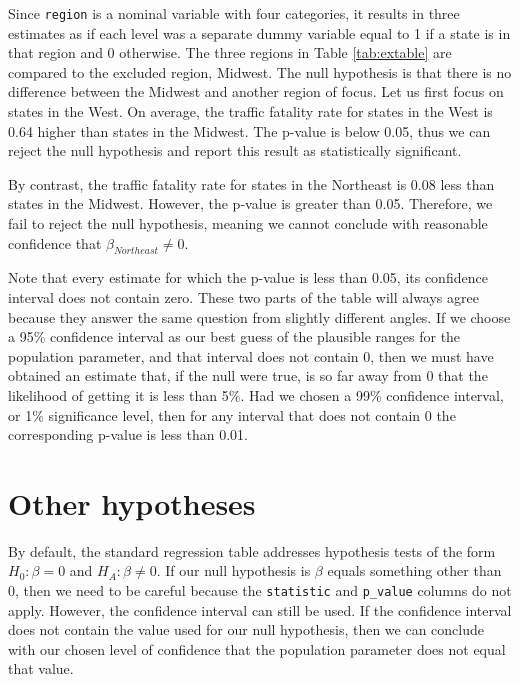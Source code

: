 \documentclass[
]{book}
\begin{document}
Since \texttt{region} is a nominal variable with four categories, it results in three estimates as if each level was a separate dummy variable equal to 1 if a state is in that region and 0 otherwise. The three regions in Table \ref{tab:extable} are compared to the excluded region, Midwest. The null hypothesis is that there is no difference between the Midwest and another region of focus. Let us first focus on states in the West. On average, the traffic fatality rate for states in the West is 0.64 higher than states in the Midwest. The p-value is below 0.05, thus we can reject the null hypothesis and report this result as statistically significant.

By contrast, the traffic fatality rate for states in the Northeast is 0.08 less than states in the Midwest. However, the p-value is greater than 0.05. Therefore, we fail to reject the null hypothesis, meaning we cannot conclude with reasonable confidence that \(\beta_{Northeast} \neq 0\).

Note that every estimate for which the p-value is less than 0.05, its confidence interval does not contain zero. These two parts of the table will always agree because they answer the same question from slightly different angles. If we choose a 95\% confidence interval as our best guess of the plausible ranges for the population parameter, and that interval does not contain 0, then we must have obtained an estimate that, if the null were true, is so far away from 0 that the likelihood of getting it is less than 5\%. Had we chosen a 99\% confidence interval, or 1\% significance level, then for any interval that does not contain 0 the corresponding p-value is less than 0.01.

\hypertarget{other-hypotheses}{%
\section{Other hypotheses}\label{other-hypotheses}}

By default, the standard regression table addresses hypothesis tests of the form \(H_0: \beta=0\) and \(H_A: \beta \neq 0\). If our null hypothesis is \(\beta\) equals something other than 0, then we need to be careful because the \texttt{statistic} and \texttt{p\_value} columns do not apply. However, the confidence interval can still be used. If the confidence interval does not contain the value used for our null hypothesis, then we can conclude with our chosen level of confidence that the population parameter does not equal that value.
\end{document}
